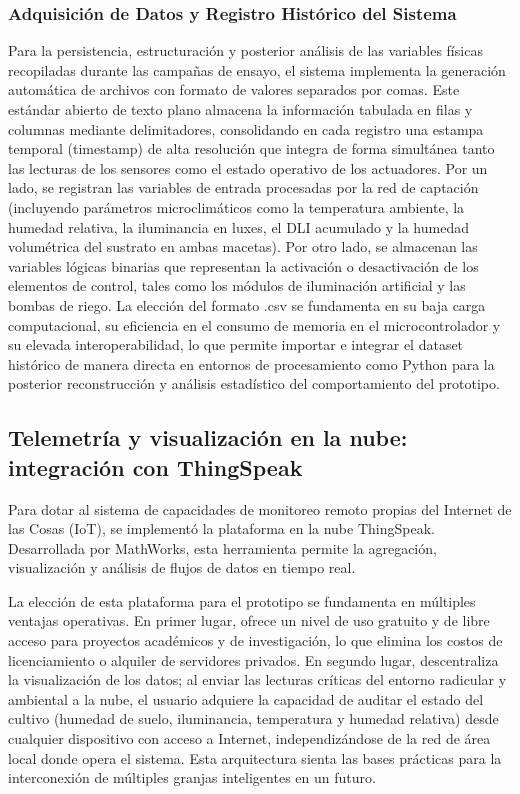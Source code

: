 \subsubsection{Adquisición de Datos y Registro Histórico del Sistema}
Para la persistencia, estructuración y posterior análisis de las variables físicas recopiladas durante las campañas de ensayo, el sistema implementa la generación automática de archivos con formato de valores separados por comas. Este estándar abierto de texto plano almacena la información tabulada en filas y columnas mediante delimitadores, consolidando en cada registro una estampa temporal (timestamp) de alta resolución que integra de forma simultánea tanto las lecturas de los sensores como el estado operativo de los actuadores. Por un lado, se registran las variables de entrada procesadas por la red de captación (incluyendo parámetros microclimáticos como la temperatura ambiente, la humedad relativa, la iluminancia en luxes, el DLI acumulado y la humedad volumétrica del sustrato en ambas macetas). Por otro lado, se almacenan las variables lógicas binarias que representan la activación o desactivación de los elementos de control, tales como los módulos de iluminación artificial y las bombas de riego. La elección del formato .csv se fundamenta en su baja carga computacional, su eficiencia en el consumo de memoria en el microcontrolador y su elevada interoperabilidad, lo que permite importar e integrar el dataset histórico de manera directa en entornos de procesamiento como Python para la posterior reconstrucción y análisis estadístico del comportamiento del prototipo.

\subsection{Telemetría y visualización en la nube: integración con ThingSpeak}
\label{subsec:thingspeak}

Para dotar al sistema de capacidades de monitoreo remoto propias del Internet de las Cosas (IoT), se implementó la plataforma en la nube ThingSpeak. Desarrollada por MathWorks, esta herramienta permite la agregación, visualización y análisis de flujos de datos en tiempo real.

La elección de esta plataforma para el prototipo se fundamenta en múltiples ventajas operativas. En primer lugar, ofrece un nivel de uso gratuito y de libre acceso para proyectos académicos y de investigación, lo que elimina los costos de licenciamiento o alquiler de servidores privados. En segundo lugar, descentraliza la visualización de los datos; al enviar las lecturas críticas del entorno radicular y ambiental a la nube, el usuario adquiere la capacidad de auditar el estado del cultivo (humedad de suelo, iluminancia, temperatura y humedad relativa) desde cualquier dispositivo con acceso a Internet, independizándose de la red de área local donde opera el sistema. Esta arquitectura sienta las bases prácticas para la interconexión de múltiples granjas inteligentes en un futuro.

